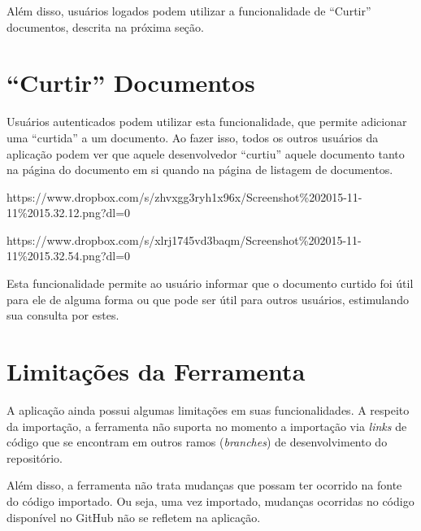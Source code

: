 Além disso, usuários logados podem utilizar a funcionalidade de ``Curtir'' documentos, descrita na próxima seção.

\section{``Curtir'' Documentos}

Usuários autenticados podem utilizar esta funcionalidade, que permite adicionar uma ``curtida'' a um documento. Ao fazer isso, todos os outros usuários da aplicação podem ver que aquele desenvolvedor ``curtiu'' aquele documento tanto na página do documento em si quando na página de listagem de documentos.

https://www.dropbox.com/s/zhvxgg3ryh1x96x/Screenshot\%202015-11-11\%2015.32.12.png?dl=0

https://www.dropbox.com/s/xlrj1745vd3baqm/Screenshot\%202015-11-11\%2015.32.54.png?dl=0

Esta funcionalidade permite ao usuário informar que o documento curtido foi útil para ele de alguma forma ou que pode ser útil para outros usuários, estimulando sua consulta por estes.

\section{Limitações da Ferramenta}

A aplicação ainda possui algumas limitações em suas funcionalidades. A respeito da importação, a ferramenta não suporta no momento a importação via \textit{links} de código que se encontram em outros ramos (\textit{branches}) de desenvolvimento do repositório.

Além disso, a ferramenta não trata mudanças que possam ter ocorrido na fonte do código importado. Ou seja, uma vez importado, mudanças ocorridas no código disponível no GitHub não se refletem na aplicação.

